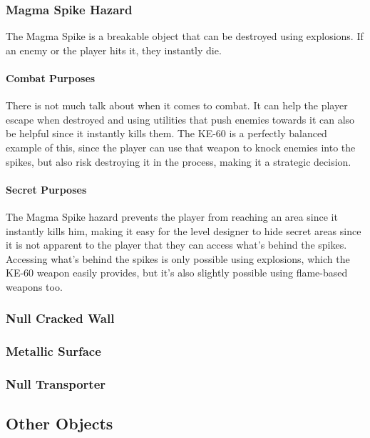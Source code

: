\documentclass[12pt]{article}
\begin{document}
\subsubsection{Magma Spike Hazard}

The Magma Spike is a breakable object that can be destroyed using explosions. If an enemy or the player hits it, they instantly die. 

\paragraph{Combat Purposes}

There is not much talk about when it comes to combat. It can help the player escape when destroyed and using utilities that push enemies towards it can also be helpful since it instantly kills them. The KE-60 is a perfectly balanced example of this, since the player can use that weapon to knock enemies into the spikes, but also risk destroying it in the process, making it a strategic decision.

\paragraph{Secret Purposes}

The Magma Spike hazard prevents the player from reaching an area since it instantly kills him, making it easy for the level designer to hide secret areas since it is not apparent to the player that they can access what's behind the spikes. Accessing what's behind the spikes is only possible using explosions, which the KE-60 weapon easily provides, but it's also slightly possible using flame-based weapons too. 

\subsubsection{Null Cracked Wall}

\subsubsection{Metallic Surface}

\subsubsection{Null Transporter}

\subsection{Other Objects}
\end{document}
